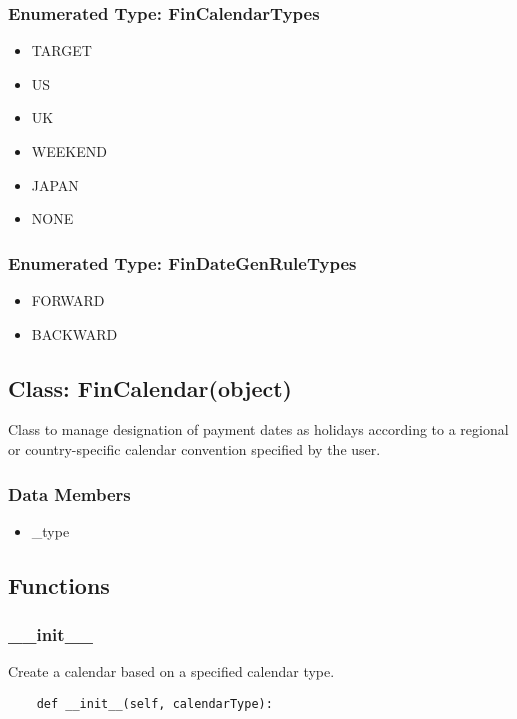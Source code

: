 \documentclass[twoside,11pt]{book}
\begin{document}
\subsubsection{Enumerated Type: FinCalendarTypes}
\begin{itemize}
\item{TARGET}
\item{US}
\item{UK}
\item{WEEKEND}
\item{JAPAN}
\item{NONE}
\end{itemize}

\subsubsection{Enumerated Type: FinDateGenRuleTypes}
\begin{itemize}
\item{FORWARD}
\item{BACKWARD}
\end{itemize}

\subsection*{Class: FinCalendar(object)}
Class to manage designation of payment dates as holidays according to a regional or country-specific calendar convention specified by the user.  

\subsubsection*{Data Members}
\begin{itemize}
\item{\_type}
\end{itemize}

\subsection*{Functions}

\subsubsection*{{\bf \_\_init\_\_}}
Create a calendar based on a specified calendar type.  

\begin{lstlisting}
    def __init__(self, calendarType):
\end{lstlisting}
\end{document}
